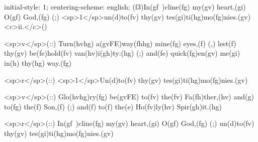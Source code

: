 initial-style: 1;
centering-scheme: english;
(f3)In(gf~)cline(fg) my(gv) heart,(gi) O(gf) God,(fg) (;) <sp>1</sp>un(d)to(fv) thy(gv) tes(gi)ti(hg)mo(fg)nies.(gv) <c>ii.</c>()

<sp>v</sp>(::) Turn(hvhg) a(gvFE)way(fhhg) mine(fg) eyes,(f) (,) lest(f) thy(gv) be(fe)hold(fv) van(hv)i(gh)ty:(hg) (;) and(fe) quick(fg)en(gv) me(gi) in(h) thy(hg) way.(fg)

<sp>r</sp>(::) <sp>1</sp>Un(d)to(fv) thy(gv) tes(gi)ti(hg)mo(fg)nies.(gv)

<sp>v</sp>(::) Glo(hvhg)ry(fg) be(gvFE) to(fv) the(fv) Fa(fh)ther,(hv) and(g) to(fg) the(f) Son,(f) (;) and(f) to(f) the(e) Ho(fv)ly(hv) Spir(gh)it.(hg)

<sp>r</sp>(::) In(gf~)cline(fg) my(gv) heart,(gi) O(gf) God,(fg) (;) un(d)to(fv) thy(gv) tes(gi)ti(hg)mo(fg)nies.(gv)